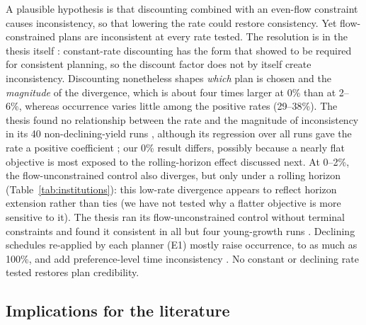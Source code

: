 A plausible hypothesis is that discounting combined with an even-flow constraint causes inconsistency, so that lowering the rate could restore consistency. Yet flow-constrained plans are inconsistent at every rate tested. The resolution is in the thesis itself \citep[ch.~3, pp.~58--60]{daugherty1991credibility}: constant-rate discounting has the form that \citet{strotz1956myopia} showed to be required for consistent planning, so the discount factor does not by itself create inconsistency. Discounting nonetheless shapes \emph{which} plan is chosen and the \emph{magnitude} of the divergence, which is about four times larger at 0\% than at 2--6\%, whereas occurrence varies little among the positive rates (29--38\%). The thesis found no relationship between the rate and the magnitude of inconsistency in its 40 non-declining-yield runs \citep[p.~113]{daugherty1991credibility}, although its regression over all runs gave the rate a positive coefficient \citep[p.~96]{daugherty1991credibility}; our 0\% result differs, possibly because a nearly flat objective is most exposed to the rolling-horizon effect discussed next. At 0--2\%, the flow-unconstrained control also diverges, but only under a rolling horizon (Table~\ref{tab:institutions}): this low-rate divergence appears to reflect horizon extension rather than ties (we have not tested why a flatter objective is more sensitive to it). The thesis ran its flow-unconstrained control without terminal constraints and found it consistent in all but four young-growth runs \citep[pp.~80, 123]{daugherty1991credibility}. Declining schedules re-applied by each planner (E1) mostly raise occurrence, to as much as 100\%, and add preference-level time inconsistency \citep{strotz1956myopia}. No constant or declining rate tested restores plan credibility.

\hypertarget{implications-for-the-literature}{%
\subsection{Implications for the literature}\label{implications-for-the-literature}}

